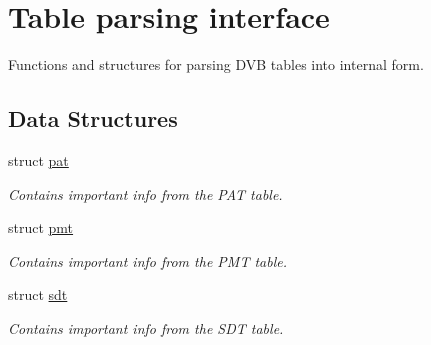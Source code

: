 \hypertarget{group__parsing}{}\section{Table parsing interface}
\label{group__parsing}


Functions and structures for parsing D\+VB tables into internal form.  


\subsection*{Data Structures}
\begin{DoxyCompactItemize}
\item 
struct \hyperlink{structpat}{pat}
\begin{DoxyCompactList}\small\item\em Contains important info from the P\+AT table. \end{DoxyCompactList}\item 
struct \hyperlink{structpmt}{pmt}
\begin{DoxyCompactList}\small\item\em Contains important info from the P\+MT table. \end{DoxyCompactList}\item 
struct \hyperlink{structsdt}{sdt}
\begin{DoxyCompactList}\small\item\em Contains important info from the S\+DT table. \end{DoxyCompactList}\end{DoxyCompactItemize}
